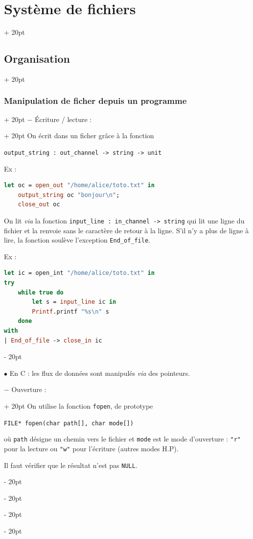 \documentclass[a4paper, 12pt, twoside]{article}
\newcommand{\ind}[1][20pt]{\advance\leftskip + #1}
\newcommand{\deind}[1][20pt]{\advance\leftskip - #1}
\newenvironment{indentedenv}[1][20pt]{\par \ind[#1]}{\par \deind}
\newenvironment{indt}[2][20pt]{#2 \begin{indentedenv}[#1]}{\end{indentedenv}} %
\begin{document}
\begin{indt}{\section{Système de fichiers}}
\begin{indt}{\subsection{Organisation}}
\begin{indt}{\subsubsection{Manipulation de ficher depuis un programme}}
                \begin{indt}{$-$ \'Ecriture / lecture :}
                    On écrit dans un ficher grâce à la fonction
                    
                    \texttt{output\_string : out\_channel -> string -> unit}
                    
                    Ex :
                    \begin{lstlisting}[language=Caml, xleftmargin=100pt]
let oc = open_out "/home/alice/toto.txt" in
    output_string oc "bonjour\n";
    close_out oc\end{lstlisting}
                    
                    \vspace{6pt}
                    
                    On lit \textit{via} la fonction \texttt{input\_line : in\_channel -> string} qui lit une ligne du fichier et la renvoie sans le caractère de retour à la ligne.
                    S'il n'y a plus de ligne à lire, la fonction soulève l'exception \texttt{End\_of\_file}.
                    
                    Ex :
                    \begin{lstlisting}[language=Caml, xleftmargin=100pt]
let ic = open_int "/home/alice/toto.txt" in
try
    while true do
        let s = input_line ic in
        Printf.printf "%s\n" s
    done
with
| End_of_file -> close_in ic\end{lstlisting}
                \end{indt}
                \vspace{12pt}
                
                $\bullet$ En C : les flux de données sont manipulés \textit{via} des pointeurs.
                
                \begin{indt}{$-$ Ouverture :}
                    On utilise la fonction \texttt{fopen}, de prototype 
                    
                    \texttt{FILE* fopen(char path[], char mode[])}
                    
                    où \texttt{path} désigne un chemin vers le fichier et \texttt{mode} est le mode d'ouverture : \texttt{"r"} pour la lecture ou \texttt{"w"} pour l'écriture (autres modes H.P).
                    
                    Il faut vérifier que le résultat n'est pas \texttt{NULL}.
                \end{indt}
                

\end{indt}
\end{indt}
\end{indt}
\end{document}
